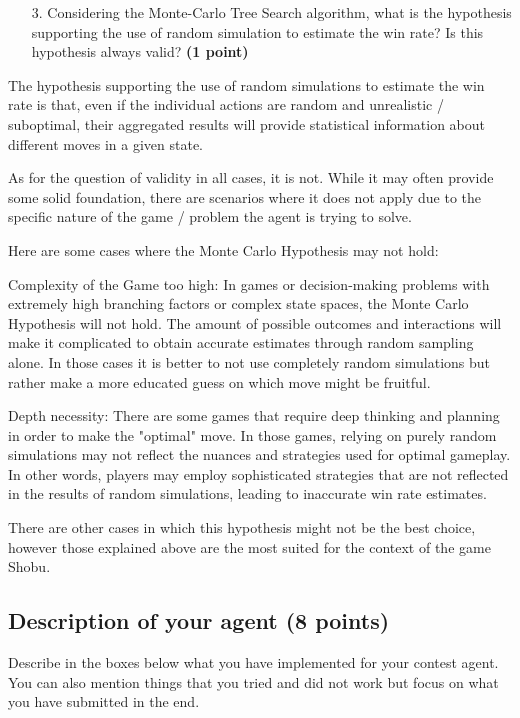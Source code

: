 \documentclass[11pt,a4paper]{report}
\begin{document}
\begin{enumerate}
\item[3.] Considering the Monte-Carlo Tree Search algorithm, what is the hypothesis supporting the use of random simulation to estimate the win rate? Is this hypothesis always valid? \textbf{(1 point)}
\end{enumerate}

\begin{answers}[15cm]
    The hypothesis supporting the use of random simulations to estimate the win rate is that, even if the individual actions are random and unrealistic / suboptimal,
    their aggregated results will provide statistical information about different moves in a given state. 
 
    As for the question of validity in all cases, it is not. While it may often provide some solid foundation, there are scenarios where it does not apply due to 
    the specific nature of the game / problem the agent is trying to solve. 
    
    Here are some cases where the Monte Carlo Hypothesis may not hold:
    
    Complexity of the Game too high: In games or decision-making problems with extremely high branching factors or complex state spaces, the Monte Carlo Hypothesis will not hold. The amount of possible outcomes and interactions will make it complicated to obtain accurate estimates through random sampling alone.
    In those cases it is better to not use completely random simulations but rather make a more educated guess on which move might be fruitful.

    Depth necessity: There are some games that require deep thinking and planning in order to make the "optimal" move. 
    In those games, relying on purely random simulations may not reflect the nuances and strategies used for optimal gameplay. 
    In other words, players may employ sophisticated strategies that are not reflected in the results of random simulations, leading to inaccurate win rate estimates.

    There are other cases in which this hypothesis might not be the best choice, however those explained above are the most
    suited for the context of the game Shobu.
\end{answers}


\newpage
\subsection{Description of your agent (8 points)}
Describe in the boxes below what you have implemented for your contest agent. You can also mention things that you tried and did not work but focus on what you have submitted in the end.
\end{document}
